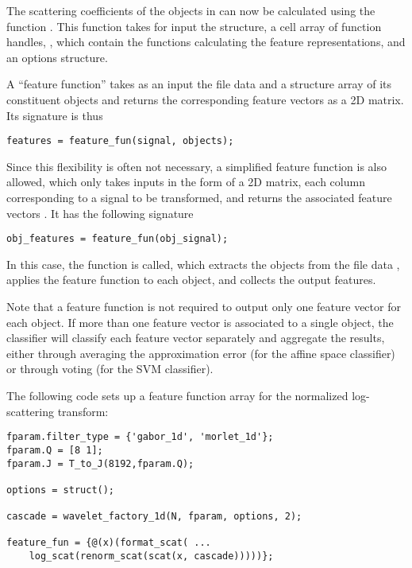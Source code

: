 \documentclass[twocolumn]{article}
\begin{document}
The scattering coefficients of the objects in  can now be calculated using the function . This function takes for input the  structure, a cell array of function handles, , which contain the functions calculating the feature representations, and an options structure.

A ``feature function'' takes as an input the file data and a structure array of its constituent objects and returns the corresponding feature vectors as a 2D matrix. Its signature is thus
\begin{lstlisting}
features = feature_fun(signal, objects);
\end{lstlisting}
Since this flexibility is often not necessary, a simplified feature function is also allowed, which only takes inputs  in the form of a 2D matrix, each column corresponding to a signal to be transformed, and returns the associated feature vectors . It has the following signature
\begin{lstlisting}
obj_features = feature_fun(obj_signal);
\end{lstlisting}
In this case, the function  is called, which extracts the objects from the file data , applies the feature function to each object, and collects the output features.

Note that a feature function is not required to output only one feature vector for each object. If more than one feature vector is associated to a single object, the classifier will classify each feature vector separately and aggregate the results, either through averaging the approximation error (for the affine space classifier) or through voting (for the SVM classifier).

The following code sets up a feature function array for the normalized log-scattering transform:
\begin{lstlisting}
fparam.filter_type = {'gabor_1d', 'morlet_1d'};
fparam.Q = [8 1];
fparam.J = T_to_J(8192,fparam.Q);

options = struct();

cascade = wavelet_factory_1d(N, fparam, options, 2);

feature_fun = {@(x)(format_scat( ...
	log_scat(renorm_scat(scat(x, cascade)))))};
\end{lstlisting}
\end{document}
